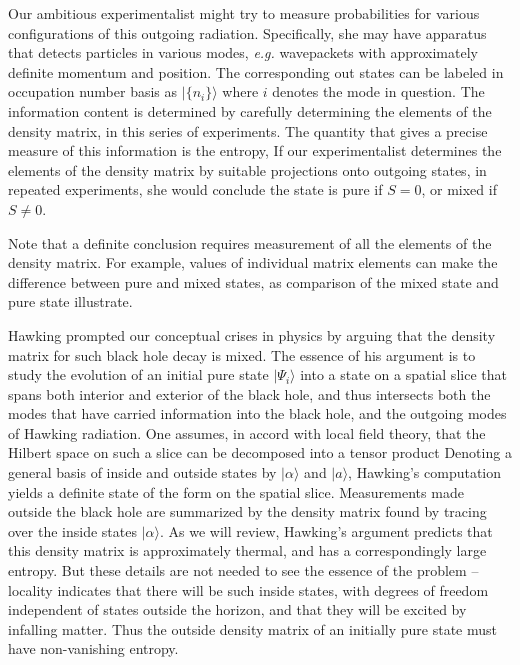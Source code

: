 Our ambitious experimentalist might try to measure probabilities for various configurations of this outgoing radiation.  Specifically, she may have apparatus that detects particles in various modes, {\it e.g.} wavepackets with approximately definite momentum and position.  The corresponding out states can be labeled in occupation number basis as $|\{n_i\}\rangle$ where $i$ denotes the mode in question.  The information content is determined by carefully determining the elements of the density matrix,
%
\eqn\denselem{\rho_{\ncol\ncolp} = \langle \ncol|\rho | \ncolp\rangle\ ,}
%
in this series of experiments.
The quantity that gives a precise measure of this information is the entropy, 
%
\eqn{}
%
If our experimentalist determines the elements of the density matrix by suitable projections onto outgoing states, in repeated  experiments, she would conclude  the state is pure if $S=0$, or mixed if $S\neq0$.  

Note that a definite conclusion requires measurement of all the elements of the density matrix. For example, values of individual matrix elements can make the difference between pure and mixed states, as comparison of the mixed state 
%
\eqn{}
%
and pure state
%
\eqn{}
%
illustrate.

Hawking prompted our  conceptual crises in physics by arguing that the density matrix for such black hole decay is mixed.  The essence of his argument is to study the evolution of an initial pure state $|\Psi_i\rangle$ into a state on a spatial slice that spans both interior and exterior of the black hole, and thus intersects both the modes that have carried information into the black hole, and the outgoing modes of Hawking radiation.  One assumes, in accord with local field theory, that the Hilbert space on such a slice can be decomposed into a tensor product
%
\eqn{}
%
Denoting a general basis of inside and outside states by $|\alpha\rangle$ and $|a\rangle$, 
Hawking's computation yields a definite state of the form
%
\eqn{}
%
on the spatial slice.
Measurements made outside the black hole are summarized by the density matrix found by tracing over the inside states $|\alpha\rangle$.  As we will review, Hawking's argument predicts that this density matrix is approximately thermal, and has a correspondingly large entropy.  But these details are not needed to see the essence of the problem -- locality indicates that there will be such inside states, with degrees of freedom independent of states outside the horizon, and that they will be excited by infalling matter.  Thus the outside density matrix of an initially pure state must have non-vanishing entropy.

